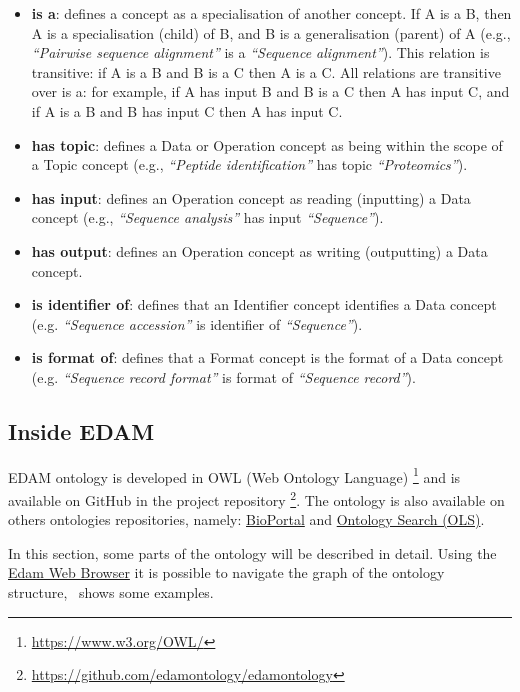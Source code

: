 \documentclass{scrartcl}
\begin{document}
\begin{itemize}
  \item \textbf{is a}: defines a concept as a specialisation of 
    another concept. If A is a B, then A is a specialisation (child) 
    of B, and B is a generalisation (parent) of A (e.g., 
    \textit{“Pairwise sequence alignment”} is a \textit{“Sequence alignment”}).
    This relation is transitive: if A is a B and B is a C then A is a C.
    All relations are transitive over is a: for example, if A 
    has input B and B is a C then A has input C, 
    and if A is a B and B has input C then A has input C.
  \item \textbf{has topic}: defines a Data or Operation concept as being 
    within the scope of a Topic concept (e.g., \textit{“Peptide identification”}
    has topic \textit{“Proteomics”}).
  \item \textbf{has input}: defines an Operation concept as reading (inputting) 
    a Data concept (e.g., \textit{“Sequence analysis”} has input 
    \textit{“Sequence”}).
  \item \textbf{has output}: defines an Operation concept as writing (outputting) 
    a Data concept.
  \item \textbf{is identifier of}: defines that an Identifier concept identifies 
    a Data concept (e.g. \textit{“Sequence accession”} 
    is identifier of \textit{“Sequence”}).
  \item \textbf{is format of}: defines that a Format concept is the format of a 
    Data concept (e.g. \textit{“Sequence record format”} is format 
    of \textit{“Sequence record”}).
\end{itemize}

\subsection{Inside EDAM}

EDAM ontology is developed in OWL (Web Ontology Language) \footnote{\url{https://www.w3.org/OWL/}} 
  and is available on GitHub in the project repository 
  \footnote{\url{https://github.com/edamontology/edamontology}}. 
  The ontology is also available on others ontologies repositories, namely:
  \href{https://bioportal.bioontology.org/ontologies/EDAM?p=classes}{BioPortal} 
  and \href{https://www.ebi.ac.uk/ols/ontologies/edam}{Ontology Search (OLS)}.
  
In this section, some parts of the ontology will be described in detail. Using the 
  \href{https://edamontology.github.io/edam-browser/}{Edam Web Browser} it is possible to navigate 
  the graph of the ontology structure,~ shows some examples. 
\end{document}
